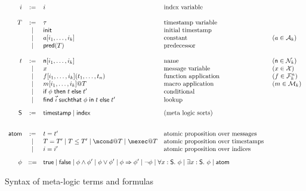\begin{figure}[t]
  \begin{gather*}
    \begin{array}{rclll}
      i &:=& i & \text{index variable} & \\
      \\
      T &:=& \tau & \text{timestamp variable} & \\
      &\mid& \tinit & \text{initial timestamp} & \\
      &\mid& a[i_1,\ldots,i_k] & \text{constant} & (a\in\Act_k) \\
      &\mid & \pre(T) & \text{predecessor} & \\
      \\
      t & := & \mathsf{n}[i_1,\ldots,i_k] &\text{name} & (\mathsf{n}\in\N_k) \\
      & \mid & x  & \text{message variable} & (x\in\X) \\
      & \mid & f[i_1,\ldots,i_k](t_1,\dots,t_n) &\text{function application} &
      (f\in\F_k^n)\\
      & \mid & m[i_1,\ldots,i_k]@T &\text{macro application} & (m\in\Mac_k)\\
      & \mid & \myif \phi \mythen t \myelse t'
      &\text{conditional} \\
      & \mid & \myfind \vec{i} \mysuchthat \phi \myin t \myelse t'
      &\text{lookup}
      \\[2ex]
      \Sort &  := & \timestamp \mid \idx & \text{(meta logic sorts)} \\
      \\[2ex]
      \atom & := & t=t'
      & \text{atomic proposition over messages } \\
      &\mid & T=T' \mid T \leq T' \mid \mcond@T \mid \mexec@T &  \text{atomic proposition
        over timestamps } \\
      &\mid & i=i'  &  \text{atomic proposition
        over indices }
      \\[2ex]
      \phi & ::= &  \lefteqn{\true \mid \false \mid \phi \wedge \phi' \mid  \phi
      \vee \phi' \mid   \phi \Rightarrow \phi'\mid \neg \phi \mid
      \forall x : \Sort.\ \phi \mid \exists x:\Sort.\ \phi \mid \atom }
    \end{array}
  \end{gather*}
  \caption{Syntax of meta-logic terms and formulas}
  \label{fig:terms-form}
\end{figure}

